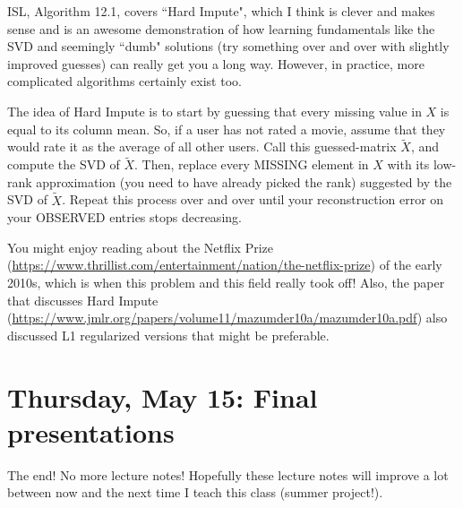 ISL, Algorithm 12.1, covers ``Hard Impute", which I think is clever and makes sense and is an awesome demonstration of how learning fundamentals like the SVD and seemingly ``dumb" solutions (try something over and over with slightly improved guesses) can really get you a long way. However, in practice, more complicated algorithms certainly exist too. 

The idea of Hard Impute is to start by guessing that every missing value in $X$ is equal to its column mean. So, if a user has not rated a movie, assume that they would rate it as the average of all other users. Call this guessed-matrix $\tilde{X}$, and compute the SVD of $\tilde{X}$. Then, replace every MISSING element in $X$ with its low-rank approximation (you need to have already picked the rank) suggested by the SVD of $\tilde{X}$. Repeat this process over and over until your reconstruction error on your OBSERVED entries stops decreasing. 

You might enjoy reading about the Netflix Prize \\ (\url{https://www.thrillist.com/entertainment/nation/the-netflix-prize})
 of the early 2010s, which is when this problem and this field really took off! Also, the paper that discusses Hard Impute (\url{https://www.jmlr.org/papers/volume11/mazumder10a/mazumder10a.pdf}) also discussed L1 regularized versions that might be preferable. 
 
\section{Thursday, May 15: Final presentations}

The end! No more lecture notes! Hopefully these lecture notes will improve a lot between now and the next time I teach this class (summer project!). 



